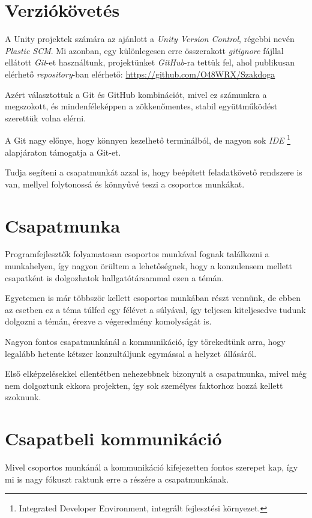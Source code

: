 \documentclass[]{thesis-ekf}
\theoremstyle{definition}
\begin{document}
	\section{Verziókövetés}
	A Unity projektek számára az ajánlott a \emph{Unity Version Control}, régebbi nevén \emph{Plastic SCM}. Mi azonban, egy különlegesen erre összerakott \emph{gitignore} fájllal ellátott \emph{Git}-et használtunk, projektünket \emph{GitHub}-ra tettük fel, ahol publikusan elérhető \emph{repository}-ban elérhető:
	\url{https://github.com/O48WRX/Szakdoga}
	
	Azért választottuk a Git és GitHub kombinációt, mivel ez számunkra a megszokott, és mindenféleképpen a zökkenőmentes, stabil együttműködést szerettük volna elérni.
	
	A Git nagy előnye, hogy könnyen kezelhető terminálból, de nagyon sok \emph{IDE} \footnote{Integrated Developer Environment, integrált fejlesztési környezet.} alapjáraton támogatja a Git-et.
	
	Tudja segíteni a csapatmunkát azzal is, hogy beépített feladatkövető rendszere is van, mellyel folytonossá és könnyűvé teszi a csoportos munkákat.
	
	\section{Csapatmunka}
	Programfejlesztők folyamatosan csoportos munkával fognak találkozni a munkahelyen, így nagyon örültem a lehetőségnek, hogy a konzulensem mellett csapatként is dolgozhatok hallgatótársammal ezen a témán.
	
	Egyetemen is már többször kellett csoportos munkában részt vennünk, de ebben az esetben ez a téma túlfed egy félévet a súlyával, így teljesen kiteljesedve tudunk dolgozni a témán, érezve a végeredmény komolyságát is.
	
	Nagyon fontos csapatmunkánál a kommunikáció, így törekedtünk arra, hogy legalább hetente kétszer konzultáljunk egymással a helyzet állásáról.
	
	Első elképzelésekkel ellentétben nehezebbnek bizonyult a csapatmunka, mivel még nem dolgoztunk ekkora projekten, így sok személyes faktorhoz hozzá kellett szoknunk.
	
	\pagebreak
	
	\section{Csapatbeli kommunikáció}
	Mivel csoportos munkánál a kommunikáció kifejezetten fontos szerepet kap, így mi is nagy fókuszt raktunk erre a részére a csapatmunkának.
	
\end{document}
